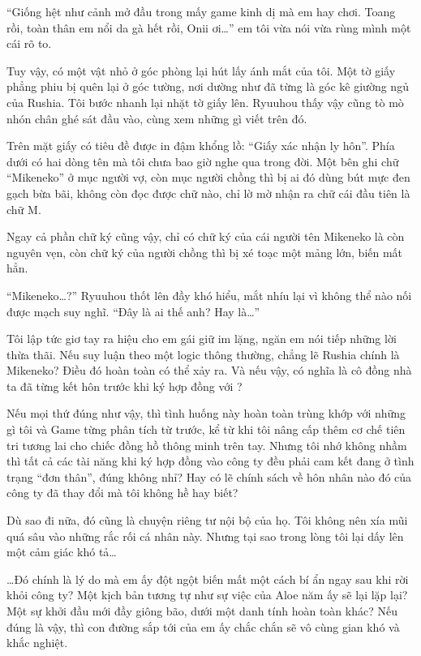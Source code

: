 \documentclass[../main.tex]{subfiles}
\begin{document}
``Giống hệt như cảnh mở đầu trong mấy game kinh dị mà em hay chơi. Toang rồi, toàn thân em nổi da gà hết rồi, Onii ơi\dots'' em tôi vừa nói vừa rùng mình một cái rõ to.

Tuy vậy, có một vật nhỏ ở góc phòng lại hút lấy ánh mắt của tôi. Một tờ giấy phẳng phiu bị quên lại ở góc tường, nơi dường như đã từng là góc kê giường ngủ của Rushia. Tôi bước nhanh lại nhặt tờ giấy lên. Ryuuhou thấy vậy cũng tò mò nhón chân ghé sát đầu vào, cùng xem những gì viết trên đó.

Trên mặt giấy có tiêu đề được in đậm khổng lồ: ``Giấy xác nhận ly hôn''. Phía dưới có hai dòng tên mà tôi chưa bao giờ nghe qua trong đời. Một bên ghi chữ ``Mikeneko'' ở mục người vợ, còn mục người chồng thì bị ai đó dùng bút mực đen gạch bừa bãi, không còn đọc được chữ nào, chỉ lờ mờ nhận ra chữ cái đầu tiên là chữ M.

Ngay cả phần chữ ký cũng vậy, chỉ có chữ ký của cái người tên Mikeneko là còn nguyên vẹn, còn chữ ký của người chồng thì bị xé toạc một mảng lớn, biến mất hẳn.

``Mikeneko\dots?'' Ryuuhou thốt lên đầy khó hiểu, mắt nhíu lại vì không thể nào nối được mạch suy nghĩ. ``Đây là ai thế anh? Hay là\dots''

Tôi lập tức giơ tay ra hiệu cho em gái giữ im lặng, ngăn em nói tiếp những lời thừa thãi. Nếu suy luận theo một logic thông thường, chẳng lẽ Rushia chính là Mikeneko? Điều đó hoàn toàn có thể xảy ra. Và nếu vậy, có nghĩa là cô đồng nhà ta đã từng kết hôn trước khi ký hợp đồng với \hll?

Nếu mọi thứ đúng như vậy, thì tình huống này hoàn toàn trùng khớp với những gì tôi và Game từng phân tích từ trước, kể từ khi tôi nâng cấp thêm cơ chế tiên tri tương lai cho chiếc đồng hồ thông minh trên tay. Nhưng tôi nhớ không nhầm thì tất cả các tài năng khi ký hợp đồng vào công ty đều phải cam kết đang ở tình trạng ``đơn thân'', đúng không nhỉ? Hay có lẽ chính sách về hôn nhân nào đó của công ty đã thay đổi mà tôi không hề hay biết?

Dù sao đi nữa, đó cũng là chuyện riêng tư nội bộ của họ. Tôi không nên xía mũi quá sâu vào những rắc rối cá nhân này. Nhưng tại sao trong lòng tôi lại dấy lên một cảm giác khó tả\dots

\dots Đó chính là lý do mà em ấy đột ngột biến mất một cách bí ẩn ngay sau khi rời khỏi công ty? Một kịch bản tương tự như sự việc của Aloe năm ấy sẽ lại lặp lại? Một sự khởi đầu mới đầy giông bão, dưới một danh tính hoàn toàn khác? Nếu đúng là vậy, thì con đường sắp tới của em ấy chắc chắn sẽ vô cùng gian khó và khắc nghiệt.
\end{document}
